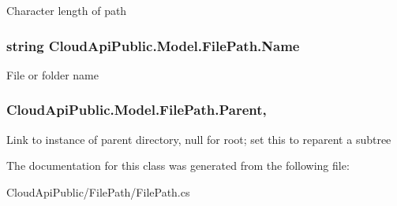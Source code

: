 Character length of path 

\hypertarget{class_cloud_api_public_1_1_model_1_1_file_path_a02285f24ec2d49c85778d6b5a251aa7b}{
\subsubsection[{Name}]{\setlength{\rightskip}{0pt plus 5cm}string Cloud\-Api\-Public.\-Model.\-File\-Path.\-Name\hspace{0.3cm}{\ttfamily [get]}}}\label{class_cloud_api_public_1_1_model_1_1_file_path_a02285f24ec2d49c85778d6b5a251aa7b}


File or folder name 

\hypertarget{class_cloud_api_public_1_1_model_1_1_file_path_a4c3e4582847856e2a49370fb421d4c70}{
\subsubsection[{Parent}]{ Cloud\-Api\-Public.\-Model.\-File\-Path.\-Parent\hspace{0.3cm}{\ttfamily [get]}, {\ttfamily [set]}}}\label{class_cloud_api_public_1_1_model_1_1_file_path_a4c3e4582847856e2a49370fb421d4c70}


Link to instance of parent directory, null for root; set this to reparent a subtree 



The documentation for this class was generated from the following file\-:\begin{DoxyCompactItemize}
\item 
Cloud\-Api\-Public/\-File\-Path/File\-Path.\-cs\end{DoxyCompactItemize}
